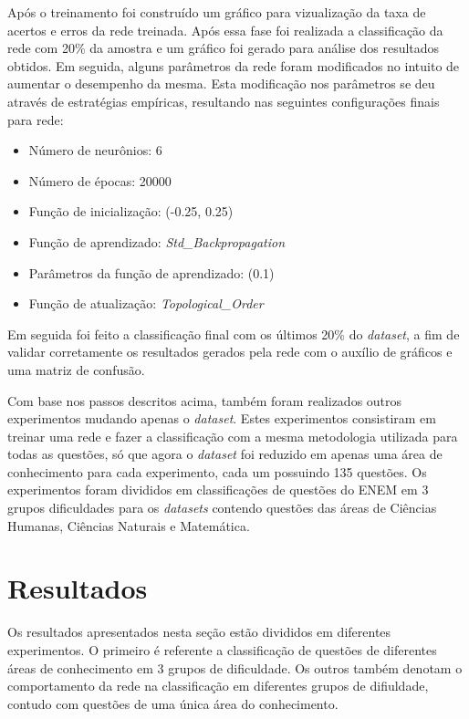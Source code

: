 \documentclass[article,	12pt,	oneside, a4paper,	english, brazil, sumario=tradicional, section=TITLE]{abntex2}
\begin{document}
Após o treinamento foi construído um gráfico para vizualização da taxa de acertos e erros da rede treinada. Após essa fase foi realizada a classificação da rede com 20\% da amostra e um gráfico foi gerado para análise dos resultados obtidos. Em seguida, alguns parâmetros da rede foram modificados no intuito de aumentar o desempenho da mesma. Esta modificação nos parâmetros se deu através de estratégias empíricas, resultando nas seguintes configurações finais para rede:

\begin{itemize}
  \item Número de neurônios: 6
  \item Número de épocas: 20000
  \item Função de inicialização: (-0.25, 0.25)
  \item Função de aprendizado: \textit{Std\_Backpropagation}
  \item Parâmetros da função de aprendizado: (0.1)
  \item Função de atualização: \textit{Topological\_Order}
\end{itemize}
 
Em seguida foi feito a classificação final com os últimos 20\% do \textit{dataset}, a fim de validar corretamente os resultados gerados pela rede com o auxílio de gráficos e uma matriz de confusão.

Com base nos passos descritos acima, também foram realizados outros experimentos mudando apenas o \textit{dataset}. Estes experimentos consistiram em treinar uma rede e fazer a classificação com a mesma metodologia utilizada para todas as questões, só que agora o \textit{dataset} foi reduzido em apenas uma área de conhecimento para cada experimento, cada um possuindo 135 questões. Os experimentos foram divididos em classificações de questões do ENEM em 3 grupos dificuldades para os \textit{datasets} contendo questões das áreas de Ciências Humanas, Ciências Naturais e Matemática.

\section{Resultados}
Os resultados apresentados nesta seção estão divididos em diferentes experimentos. O primeiro é referente a classificação de questões de diferentes áreas de conhecimento em 3 grupos de dificuldade. Os outros também denotam o comportamento da rede na classificação em diferentes grupos de difiuldade, contudo com questões de uma única área do conhecimento.
\end{document}
